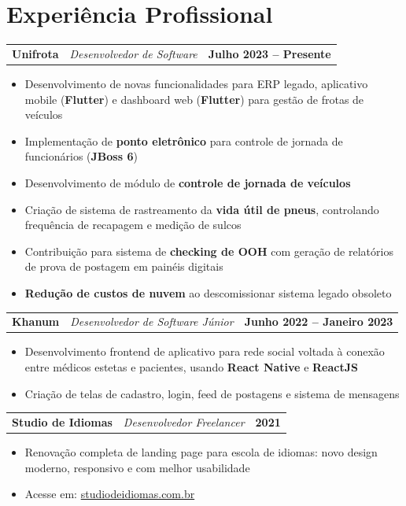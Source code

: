 \documentclass[a4paper,11pt]{article}
\makeatletter
\newenvironment{joblong}[3]
    {
    \begin{tabularx}{\linewidth}{@{}l X r@{}}
    \textbf{\color{darkblue}#1} & \hfill \textit{\small\color{medgray}#3} & \textbf{\small #2} \\[2pt]
    \end{tabularx}
    \begin{minipage}[t]{\linewidth}
    \begin{itemize}[nosep,after=\strut, leftmargin=1.2em, itemsep=3pt,label={\small\color{darkblue}$\bullet$}]
    }
    {
    \end{itemize}
    \end{minipage}
    \vspace{4pt}
    }
\makeatother
\begin{document}
\section{Experiência Profissional}

\begin{joblong}{Unifrota}{Julho 2023 -- Presente}{Desenvolvedor de Software}
\item Desenvolvimento de novas funcionalidades para ERP legado, aplicativo mobile (\textbf{Flutter}) e dashboard web (\textbf{Flutter}) para gestão de frotas de veículos
\item Implementação de \textbf{ponto eletrônico} para controle de jornada de funcionários (\textbf{JBoss 6})
\item Desenvolvimento de módulo de \textbf{controle de jornada de veículos}
\item Criação de sistema de rastreamento da \textbf{vida útil de pneus}, controlando frequência de recapagem e medição de sulcos
\item Contribuição para sistema de \textbf{checking de OOH} com geração de relatórios de prova de postagem em painéis digitais
\item \textbf{Redução de custos de nuvem} ao descomissionar sistema legado obsoleto
\end{joblong}

\begin{joblong}{Khanum}{Junho 2022 -- Janeiro 2023}{Desenvolvedor de Software Júnior}
\item Desenvolvimento frontend de aplicativo para rede social voltada à conexão entre médicos estetas e pacientes, usando \textbf{React Native} e \textbf{ReactJS}
\item Criação de telas de cadastro, login, feed de postagens e sistema de mensagens
\end{joblong}

\begin{joblong}{Studio de Idiomas}{2021}{Desenvolvedor Freelancer}
\item Renovação completa de landing page para escola de idiomas: novo design moderno, responsivo e com melhor usabilidade
\item Acesse em: \href{http://studiodeidiomas.com.br/}{studiodeidiomas.com.br}
\end{joblong}
\end{document}
